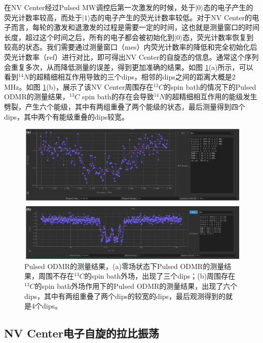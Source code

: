 \documentclass[type = bachelor, oneside]{whu-thesis}
\begin{document}
在NV Center经过Pulsed MW调控后第一次激发的时候，处于$|0\rangle$态的电子产生的荧光计数率较高，而处于$|1\rangle$态的电子产生的荧光计数率较低。对于NV Center的电子而言，每轮的激发和退激发的过程是需要一定的时间，这也就是测量窗口的时间长度，超过这个时间之后，所有的电子都会被初始化到$|0\rangle$态，荧光计数率恢复到较高的状态。我们需要通过测量窗口（mes）内荧光计数率的降低和完全初始化后荧光计数率（ref）进行对比，即可得出NV Center的自旋态的信息。通常这个序列会重复多次，从而降低测量的误差，得到更加准确的结果。如图 \ref{fig: Pulsed ODMR_results}(a)所示，可以看到$^{14}N$的超精细相互作用导致的三个dips，相邻的dips之间的距离大概是2 MHz。如图 \ref{fig: Pulsed ODMR_results}(b)，展示了该NV Center周围存在$^{13}C$的spin bath的情况下的Pulsed ODMR的测量结果，$^{13}C$ spin bath的存在会导致$^{14}N$的超精细相互作用的能级发生劈裂，产生六个能级，其中有两组重叠了两个能级的状态，最后测量得到四个dips，其中两个有能级重叠的dips较宽。

\begin{figure}
  \centering
  \includegraphics[width=1.0\textwidth]{figures/Chapter 2/Pulsed ODMR_results.png}
  \caption[Pulsed ODMR的测量结果]{Pulsed ODMR的测量结果，(a)零场状态下Pulsed ODMR的测量结果，周围不存在$^{13}C$的spin bath外场，出现了三个dips；(b)周围存在$^{13}C$的spin bath外场作用下的Pulsed ODMR的测量结果，出现了六个dips，其中有两组重叠了两个dips的较宽的dips，最后观测得到的就是4个dips。}
  \label{fig: Pulsed ODMR_results}
\end{figure}

\subsection{NV Center电子自旋的拉比振荡}
\end{document}

